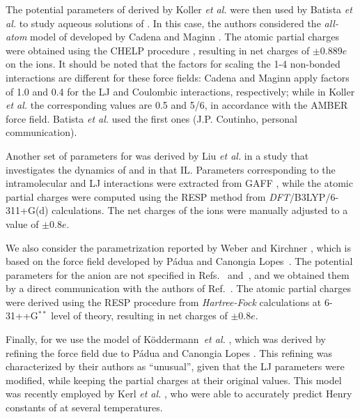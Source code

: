 \documentclass[3p,twocolumn]{elsarticle}
\begin{document}
The potential parameters of \ce{[B(CN)_4]^-} derived by Koller \textit{et al.} \cite{Koller_2012} were then used by Batista \textit{et al.} \cite{Batista_2015} to study aqueous solutions of \ce{[emim][B(CN)_4]}.
In this case, the authors considered the \textit{all-atom} model of \ce{[emim]^+} developed by Cadena and Maginn \cite{Cadena_2006}.
The atomic partial charges were obtained using the CHELP procedure \cite{Breneman_1990}, resulting in net charges of $\pm$0.889$e$ on the ions.
It should be noted that the factors for scaling the 1-4 non-bonded interactions are different for these force fields: Cadena and Maginn \cite{Cadena_2006} apply factors of 1.0 and 0.4 for the LJ and Coulombic interactions, respectively; while in Koller \textit{et al.} \cite{Koller_2012} the corresponding values are 0.5 and 5/6, in accordance with the AMBER force field.
Batista \textit{et al.} \cite{Batista_2015} used the first ones (J.P. Coutinho, personal communication).

Another set of parameters for \ce{[emim][B(CN)_4]} was derived by Liu \textit{et al.} \cite{Liu_2014} in a study that investigates the dynamics of  and  in that IL.
Parameters corresponding to the intramolecular and LJ interactions were extracted from GAFF \cite{Wang_2004}, while the atomic partial charges were computed using the RESP method \cite{Bayly_1993} from \textit{DFT}/B3LYP/6-311+G(d) calculations.
The net charges of the ions were manually adjusted to a value of $\pm$0.8$e$.

We also consider the parametrization reported by Weber and Kirchner \cite{Weber_2016}, which is based on the force field developed by P{\'{a}}dua and Canongia Lopes~\cite{Canongia_Lopes_2006}.
The potential parameters for the anion are not specified in Refs.~ and~, and we obtained them by a direct communication with the authors of Ref.~.
The atomic partial charges were derived using the RESP procedure from \textit{Hartree-Fock} calculations at 6-31++G$^{\ast \ast}$ level of theory, resulting in net charges of $\pm$0.8$e$.

Finally, for \ce{[emim][NTf_2]} we use the model of K\"{o}ddermann~\textit{et al.} \cite{K_ddermann_2007}, which was derived by refining the force field due to P{\'{a}}dua and Canongia Lopes \cite{Canongia_Lopes_2006}.
This refining was characterized by their authors as ``unusual'', given that the LJ parameters were modified, while keeping the partial charges at their original values.
This model was recently employed by Kerl \textit{et al.} \cite{Kerl__2017}, who were able to accurately predict Henry constants of  at several temperatures.
\end{document}
